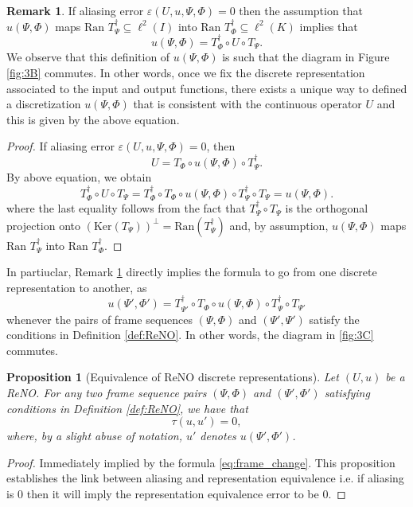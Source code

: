 \documentclass[reqno,10pt]{amsart}
\theoremstyle{plain}
\newtheorem{prop}{Proposition}
\theoremstyle{definition}
\newtheorem{rem}{Remark}
\begin{document}
    \begin{rem} \label{rem:frame_change}
        If aliasing error $\varepsilon(U,u,\Psi,\Phi) = 0$ then the assumption that $u(\Psi,\Phi)$ maps $\text{Ran } T^\dag_\Psi \subseteq \ell^2(I)$ into $\text{Ran } T^\dag_\Phi \subseteq \ell^2(K)$ implies that 
        \begin{equation}
            u(\Psi,\Phi) = T^\dag_{\Phi} \circ U \circ T_\Psi.
        \end{equation}
        We observe that this definition of $u(\Psi,\Phi)$ is such that the diagram in Figure \ref{fig:3B} commutes. In other words, once we fix the discrete representation associated to the input and output functions, there exists a unique way to defined a discretization $u(\Psi,\Phi)$ that is consistent with the continuous operator $U$ and this is given by the above equation. 
        \begin{proof}
            If aliasing error $\varepsilon(U,u,\Psi,\Phi) = 0$, then
            \begin{equation}
                U = T_\Phi \circ u(\Psi,\Phi) \circ T^\dag_\Psi.
            \end{equation}
            By above equation, we obtain
            $$ T^\dag_\Phi \circ U \circ T_\Psi = T^\dag_\Phi \circ T_\Phi \circ u(\Psi,\Phi) \circ T^\dag_\Psi \circ T_\Psi = u(\Psi,\Phi).$$
            where the last equality follows from the fact that $T^\dag_\Psi \circ T_\Psi$ is the orthogonal projection onto $(\text{Ker}(T_\Psi))^{\perp} = \text{Ran}(T^\dag_\Psi)$ and, by assumption, $u(\Psi,\Phi)$ maps $\text{Ran }T^\dag_\Psi$ into $\text{Ran }T^\dag_\Phi$.
        \end{proof}
    \end{rem}

    \noindent In partiuclar, Remark \ref{rem:frame_change} directly implies the formula to go from one discrete representation to another, as
    \begin{equation} \label{eq:frame_change}
        u(\Psi',\Phi') = T^\dag_{\Psi'} \circ T_\Phi \circ u(\Psi,\Phi) \circ T^\dag_\Psi \circ T_{\Psi'}
    \end{equation}
    whenever the pairs of frame sequences $(\Psi,\Phi)$ and $(\Psi',\Psi')$ satisfy the conditions in Definition \ref{def:ReNO}. In other words, the diagram in \ref{fig:3C} commutes.

    \begin{prop}[Equivalence of ReNO discrete representations]
        Let $(U,u)$ be a ReNO. For any two frame sequence pairs $(\Psi,\Phi)$ and $(\Psi',\Phi')$ satisfying conditions in Definition \ref{def:ReNO}, we have that 
        $$ \tau(u,u') = 0,$$
        where, by a slight abuse of notation, $u'$ denotes $u(\Psi',\Phi')$.
    \end{prop}
    \begin{proof}
        Immediately implied by the formula \ref{eq:frame_change}. This proposition establishes the link between aliasing and representation equivalence i.e. if aliasing is $0$ then it will imply the representation equivalence error to be $0$.
    \end{proof}




\end{document}
